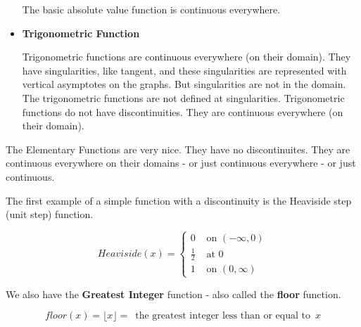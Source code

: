 \documentclass{ximera}
\begin{document}
\begin{itemize}
The basic absolute value function is continuous everywhere.







\item \textbf{\textcolor{blue!55!black}{Trigonometric Function}} 

Trigonometric functions are continuous everywhere (on their domain).  They have singularities, like tangent, and these singularities are represented with vertical asymptotes on the graphs.  But singularities are not in the domain.  The trigonometric functions are not defined at singularities. Trigonometric functions do not have discontinuities.  They are continuous everywhere (on their domain). 








\end{itemize}




The Elementary Functions are very nice.  They have no discontinuites.  They are continuous everywhere on their domains - or just continuous everywhere - or just continuous.





The first example of a simple function with a discontinuity is the Heaviside step (unit step) function.






\[
Heaviside(x) = 
\begin{cases}
  0 & \text{ on } (-\infty, 0) \\
  \tfrac{1}{2} & \text{ at } 0 \\
  1 & \text{ on } (0, \infty) 
\end{cases}
\]






We also have the \textbf{Greatest Integer} function - also called the \textbf{floor} function.


\[
floor(x) = \lfloor x \rfloor = \, \text{ the greatest integer less than or equal to } \, x
\]
\end{document}
